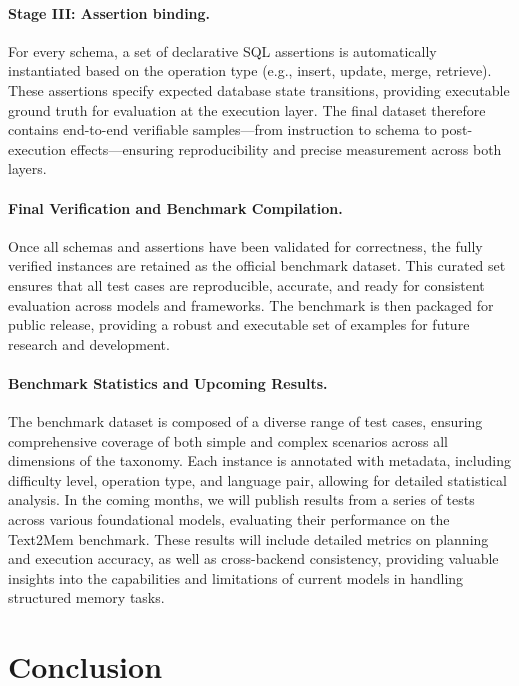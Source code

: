 \documentclass[conference]{IEEEtran}
\begin{document}
\paragraph{Stage III: Assertion binding.}
For every schema, a set of declarative SQL assertions is automatically instantiated based on the operation type (e.g., insert, update, merge, retrieve).  
These assertions specify expected database state transitions, providing executable ground truth for evaluation at the execution layer.  
The final dataset therefore contains end-to-end verifiable samples—from instruction to schema to post-execution effects—ensuring reproducibility and precise measurement across both layers.

\paragraph{Final Verification and Benchmark Compilation.}
Once all schemas and assertions have been validated for correctness, the fully verified instances are retained as the official benchmark dataset.  
This curated set ensures that all test cases are reproducible, accurate, and ready for consistent evaluation across models and frameworks.  
The benchmark is then packaged for public release, providing a robust and executable set of examples for future research and development.

\paragraph{Benchmark Statistics and Upcoming Results.}
The benchmark dataset is composed of a diverse range of test cases, ensuring comprehensive coverage of both simple and complex scenarios across all dimensions of the taxonomy.  
Each instance is annotated with metadata, including difficulty level, operation type, and language pair, allowing for detailed statistical analysis.  
In the coming months, we will publish results from a series of tests across various foundational models, evaluating their performance on the Text2Mem benchmark.  
These results will include detailed metrics on planning and execution accuracy, as well as cross-backend consistency, providing valuable insights into the capabilities and limitations of current models in handling structured memory tasks.

\section{Conclusion}
\label{sec:conclusion}
\end{document}
